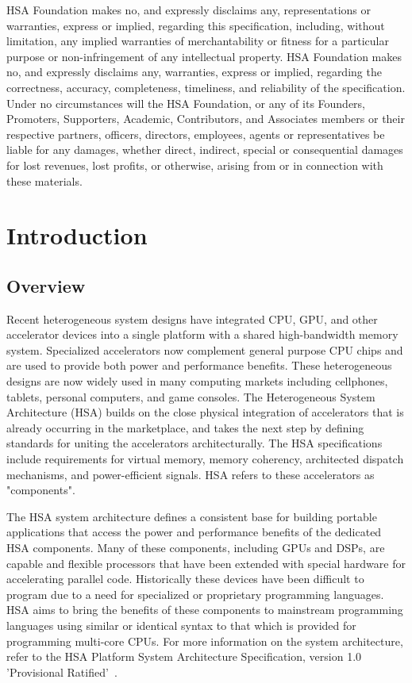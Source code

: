 \documentclass[final]{book}
\begin{document}
HSA Foundation makes no, and expressly disclaims any, representations or
warranties, express or implied, regarding this specification, including, without
limitation, any implied warranties of merchantability or fitness for a
particular purpose or non-infringement of any intellectual property. HSA
Foundation makes no, and expressly disclaims any, warranties, express or
implied, regarding the correctness, accuracy, completeness, timeliness, and
reliability of the specification. Under no circumstances will the HSA
Foundation, or any of its Founders, Promoters, Supporters, Academic,
Contributors, and Associates members or their respective partners, officers,
directors, employees, agents or representatives be liable for any damages,
whether direct, indirect, special or consequential damages for lost revenues,
lost profits, or otherwise, arising from or in connection with these materials.

\clearpage
{}
{} %
\tableofcontents

\clearpage
{}
\setcounter{page}{1}

\chapter{Introduction} \label{index}
\section{Overview}\label{overview}

Recent heterogeneous system designs have integrated CPU, GPU, and other
accelerator devices into a single platform with a shared high-bandwidth memory
system.  Specialized accelerators now complement general purpose CPU chips and
are used to provide both power and performance benefits.  These
heterogeneous designs are now widely used in many computing markets including
cellphones, tablets, personal computers, and game consoles. The Heterogeneous
System Architecture (HSA) builds on the close physical integration of
accelerators that is already occurring in the marketplace, and takes the next
step by defining standards for uniting the accelerators architecturally. The HSA
specifications include requirements for virtual memory, memory coherency,
architected dispatch mechanisms, and power-efficient signals. HSA refers to
these accelerators as "components".

The HSA system architecture defines a consistent base for building portable
applications that access the power and performance benefits of the dedicated HSA
components. Many of these components, including GPUs and DSPs, are capable and
flexible processors that have been extended with special hardware for
accelerating parallel code. Historically these devices have been difficult to
program due to a need for specialized or proprietary programming languages. HSA
aims to bring the benefits of these components to mainstream programming
languages using similar or identical syntax to that which is provided for
programming multi-core CPUs. For more information on the system architecture,
refer to the HSA Platform System Architecture Specification, version 1.0
'Provisional Ratified'~\cite{sar}.
\end{document}
